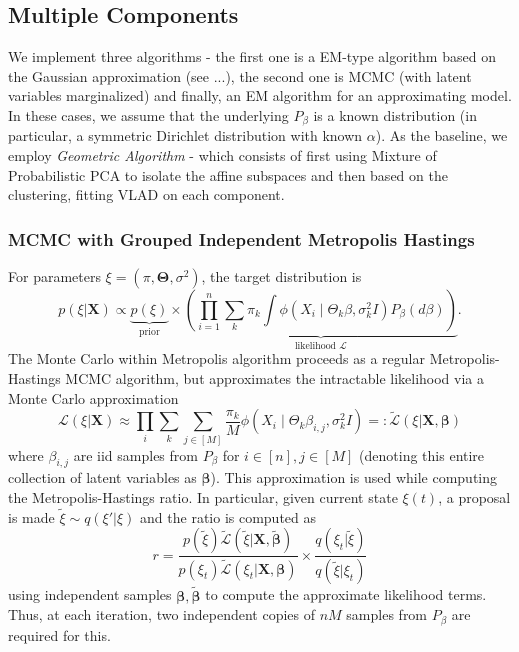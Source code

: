 \documentclass[bj,authoryear]{imsart}
\theoremstyle{plain}
\theoremstyle{remark}
\def\bX{\mathbf{X}}
\def\bTheta{{\boldsymbol\Theta}}
\def\bbeta{{\boldsymbol\beta}}
\def\cL{\mathcal{L}}
\def\bTheta{\boldsymbol{\Theta}}
\begin{document}
\begin{appendix}
\subsection{Multiple Components}\label{app:multiple_component_algorithms}
We implement three algorithms - the first one is a EM-type algorithm based on the Gaussian approximation (see ...), the second one is MCMC (with latent variables marginalized) and finally, an EM algorithm for an approximating model. In these cases, we assume that the underlying $P_{\beta}$ is a known distribution (in particular, a symmetric Dirichlet distribution with known $\alpha$). As the baseline, we employ \textit{Geometric Algorithm} - which consists of first using Mixture of Probabilistic PCA to isolate the affine subspaces and then based on the clustering, fitting VLAD on each component.

\subsubsection{MCMC with Grouped Independent Metropolis Hastings}\label{subsec:mcmc_multiple_components}
For parameters $\xi=(\pi,\bTheta,\sigma^2)$, the target distribution is
$$p(\xi|\bX) \propto  \underbrace{p(\xi)}_{\text{prior}}\times \underbrace{\left(\prod_{i=1}^n \sum_k \pi_k \int \phi(X_i\mid \Theta_k\beta,\sigma_k^2 I) P_{\beta}(d\beta)\right)}_{\text{likelihood } \cL}.$$
The Monte Carlo within Metropolis algorithm proceeds as a regular Metropolis-Hastings MCMC algorithm, but approximates the intractable likelihood via a Monte Carlo approximation
$$\cL(\xi|\bX) \approx \prod_i \sum_k \sum_{j\in[M]} \frac{\pi_k}{M} \phi(X_i\mid \Theta_k \beta_{i,j},\sigma_k^2 I)=:\tilde{\cL}(\xi|\bX,\bbeta)$$
where $\beta_{i,j}$ are iid samples from $P_{\beta}$ for $i\in[n], j\in[M]$ (denoting this entire collection of latent variables as $\bbeta$). This approximation is used while computing the Metropolis-Hastings ratio. In particular, given current state $\xi(t)$, a proposal is made $\tilde{\xi}\sim q(\xi'|\xi)$ and the ratio is computed as
$$r = \frac{p(\tilde{\xi})\tilde{\cL}(\tilde{\xi}|\bX,\tilde{\bbeta})}{p(\xi_t)\tilde{\cL}(\xi_t|\bX,\bbeta)}\times \frac{q(\xi_t|\tilde{\xi})}{q(\tilde{\xi}|\xi_t)}$$
using independent samples $\bbeta, \tilde{\bbeta}$ to compute the approximate likelihood terms. Thus, at each iteration, two independent copies of $nM$ samples from $P_{\beta}$ are required for this.


\end{appendix}
\end{document}
